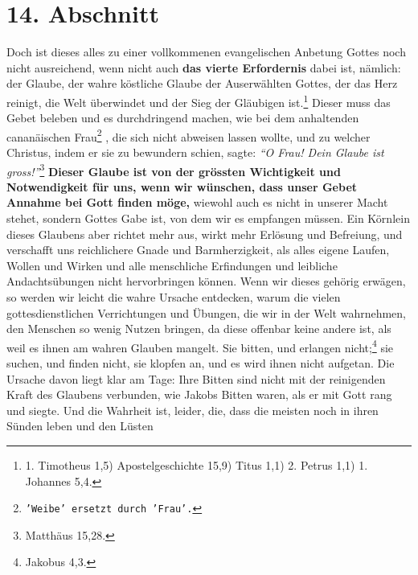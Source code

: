 \section{14. Abschnitt} \label{kap6_ab14}

Doch ist dieses alles zu einer vollkommenen evangelischen Anbetung Gottes noch
nicht ausreichend, wenn nicht auch \textbf{das vierte Erfordernis} dabei ist,
nämlich:
der Glaube, der wahre köstliche Glaube der Auserwählten Gottes, der das Herz
reinigt, die Welt überwindet und der Sieg der Gläubigen ist.\footnote{1.
Timotheus 1,5) Apostelgeschichte 15,9) Titus 1,1) 2. Petrus 1,1) 1.
Johannes 5,4.}
Dieser muss das
Gebet beleben und es durchdringend machen, wie bei dem anhaltenden cananäischen
Frau\footnote{\texttt{'Weibe' ersetzt durch 'Frau'.}}
, die sich
nicht abweisen lassen wollte, und zu welcher Christus, indem er
sie zu bewundern schien, sagte:
\textit{"`O Frau! Dein Glaube ist gross!"'}\footnote{Matthäus 15,28.}
\textbf{Dieser Glaube ist von der grössten
Wichtigkeit
und Notwendigkeit für uns, wenn wir wünschen, dass unser Gebet Annahme bei Gott
finden möge,} wiewohl auch es nicht in unserer Macht stehet, sondern Gottes Gabe
ist, von dem wir es empfangen müssen. Ein Körnlein dieses Glaubens aber richtet
mehr aus, wirkt mehr Erlösung und Befreiung, und verschafft uns
reichlichere
Gnade und Barmherzigkeit, als alles eigene Laufen, Wollen und Wirken und alle
menschliche Erfindungen und leibliche Andachtsübungen nicht hervorbringen
können. Wenn wir dieses gehörig erwägen, so werden wir leicht die wahre Ursache
entdecken, warum die vielen gottesdienstlichen Verrichtungen und Übungen, die
wir in der Welt wahrnehmen, den Menschen so wenig Nutzen bringen, da diese
offenbar keine andere ist, als weil es ihnen am wahren Glauben mangelt. Sie
bitten, und erlangen nicht;\footnote{Jakobus 4,3.}
sie suchen, und finden nicht, sie
klopfen an, und es wird ihnen nicht aufgetan. Die Ursache davon liegt klar am
Tage: Ihre Bitten sind nicht mit der reinigenden Kraft des Glaubens verbunden,
wie Jakobs Bitten waren, als er mit Gott rang und
siegte. Und die Wahrheit
ist, leider, die, dass die meisten noch in ihren Sünden leben und den Lüsten
